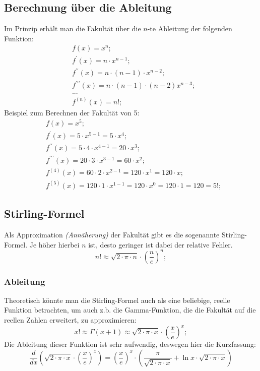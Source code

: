 \documentclass[a4paper]{article}
\begin{document}
\subsection{Berechnung über die Ableitung}
Im Prinzip erhält man die Fakultät über die $n$-te Ableitung der folgenden Funktion:
\begin{align*}
	& f(x) = x^n ;
	\\
	& f^\prime(x) = n \cdot x^{n - 1} ;
	\\
	& f^{\prime\prime}(x) = n \cdot \left( n - 1 \right) \cdot x^{n - 2} ;
	\\
	& f^{\prime\prime\prime}(x) = n \cdot \left( n - 1 \right) \cdot \left( n - 2 \right)x^{n - 3} ;
	\\
	& ...
	\\
	& f^{(n)}(x) = n! ;
\end{align*}
Beispiel zum Berechnen der Fakultät von 5:
\begin{align*}
	& f(x) = x^5 ;
	\\
	& f^\prime(x) = 5 \cdot x^{5 - 1} = 5 \cdot x^4 ;
	\\
	& f^{\prime\prime}(x) = 5 \cdot 4 \cdot x^{4 - 1} = 20 \cdot x^3 ;
	\\
	& f^{\prime\prime\prime}(x) = 20 \cdot 3 \cdot x^{3 - 1} = 60 \cdot x^2;
	\\
	& f^{(4)}(x) = 60 \cdot 2 \cdot x^{2 - 1} = 120 \cdot x^1 = 120 \cdot x ;
	\\
	& f^{(5)}(x) = 120 \cdot 1 \cdot x^{1 - 1} = 120 \cdot x^0 = 120 \cdot 1 = 120 = 5! ;
\end{align*}

\subsection{Stirling-Formel}
Als Approximation \textit{(Annäherung)} der Fakultät gibt es die sogenannte Stirling-Formel. Je höher hierbei $n$ ist, desto geringer ist dabei der relative Fehler.
\[
	n! \approx \sqrt{2 \cdot \pi \cdot n} \cdot \left( \frac{n}{e} \right) ^n ;
\]

\subsubsection{Ableitung}
Theoretisch könnte man die Stirling-Formel auch als eine beliebige, reelle Funktion betrachten, um auch z.b. die Gamma-Funktion, die die Fakultät auf die reellen Zahlen erweitert, zu approximieren:
\[
	x! \approx \Gamma(x + 1) \approx \sqrt{2 \cdot \pi \cdot x} \cdot \left( \frac{x}{e} \right) ^x ;
\]
Die Ableitung dieser Funktion ist sehr aufwendig, deswegen hier die Kurzfassung:
\[
	\frac{d}{dx} \left( \sqrt{2 \cdot \pi \cdot x} \cdot \left( \frac{x}{e} \right) ^x \right) = \left( \frac{x}{e} \right) ^x \cdot \left( \frac{\pi}{\sqrt{2 \cdot \pi \cdot x}} + \ln{x} \cdot \sqrt{2 \cdot \pi \cdot x} \right)
\]
\end{document}

